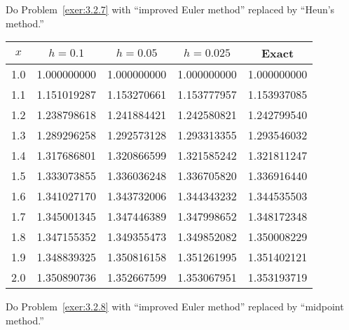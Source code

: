 \documentclass{ximera}
\begin{document}
\begin{problem}\label{exer:3.2.24} 
Do Problem~\ref{exer:3.2.7} with ``improved Euler method''
replaced by ``Heun's method.''

\begin{solution}
    {\small
\begin{tabular}{|c|r|r|r|r|}\hline
\multicolumn{1}{|c|}{$x$}&
\multicolumn{1}{|c|}{$h=0.1$}&
\multicolumn{1}{|c|}{$h=0.05$}&
\multicolumn{1}{|c|}{$h=0.025$}&
\multicolumn{1}{|c|}{Exact}\\ \hline
1.0 & 1.000000000 & 1.000000000 & 1.000000000 & 1.000000000 \\
1.1 & 1.151019287 & 1.153270661 & 1.153777957 & 1.153937085 \\
1.2 & 1.238798618 & 1.241884421 & 1.242580821 & 1.242799540 \\
1.3 & 1.289296258 & 1.292573128 & 1.293313355 & 1.293546032 \\
1.4 & 1.317686801 & 1.320866599 & 1.321585242 & 1.321811247 \\
1.5 & 1.333073855 & 1.336036248 & 1.336705820 & 1.336916440 \\
1.6 & 1.341027170 & 1.343732006 & 1.344343232 & 1.344535503 \\
1.7 & 1.345001345 & 1.347446389 & 1.347998652 & 1.348172348 \\
1.8 & 1.347155352 & 1.349355473 & 1.349852082 & 1.350008229 \\
1.9 & 1.348839325 & 1.350816158 & 1.351261995 & 1.351402121 \\
2.0 & 1.350890736 & 1.352667599 & 1.353067951 & 1.353193719\\
\hline
\end{tabular}}
\end{solution}
\end{problem}

\begin{problem}\label{exer:3.2.25}
Do Problem~\ref{exer:3.2.8} with ``improved Euler method''
replaced by ``midpoint method.''
\end{problem}
\end{document}
